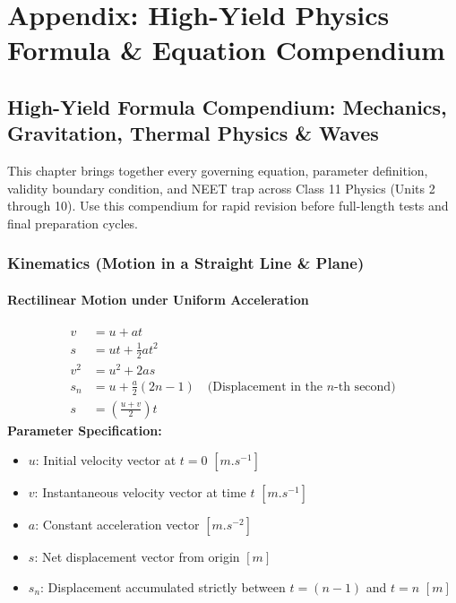 \documentclass[10pt,twoside,openright]{book}
\begin{document}
\appendix
\part*{Appendix: High-Yield Physics Formula \& Equation Compendium}

\chapter{High-Yield Formula Compendium: Mechanics, Gravitation, Thermal Physics \& Waves}

This chapter brings together every governing equation, parameter definition, validity boundary condition, and NEET trap across Class 11 Physics (Units 2 through 10). Use this compendium for rapid revision before full-length tests and final preparation cycles.

\section{Kinematics (Motion in a Straight Line \& Plane)}

\subsection{Rectilinear Motion under Uniform Acceleration}

\begin{formulabox}[Master Kinematic Equations (Constant Acceleration $a = \text{const}$)]
\begin{align}
  v &= u + at \\
  s &= ut + \frac{1}{2}at^2 \\
  v^2 &= u^2 + 2as \\
  s_n &= u + \frac{a}{2}(2n - 1) \quad \text{(Displacement in the $n$-th second)} \\
  s &= \left(\frac{u + v}{2}\right)t
\end{align}
\textbf{Parameter Specification:}
\begin{itemize}
  \item $u$: Initial velocity vector at $t=0$ $[\si{m.s^{-1}}]$
  \item $v$: Instantaneous velocity vector at time $t$ $[\si{m.s^{-1}}]$
  \item $a$: Constant acceleration vector $[\si{m.s^{-2}}]$
  \item $s$: Net displacement vector from origin $[\si{m}]$
  \item $s_n$: Displacement accumulated strictly between $t = (n-1)$ and $t = n$ $[\si{m}]$
\end{itemize}
\end{formulabox}
\end{document}
